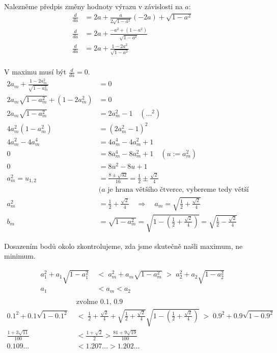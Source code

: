 \documentclass[12pt]{article}
\begin{document}
\begin{enumerate}
\begin{enumerate}
      Nalezněme předpis změny hodnoty výrazu v závislosti na $a$:
      \begin{align*}
        \frac{d}{da} &= 2a + \frac{a}{2\sqrt{1-a^2}}(-2a) + \sqrt{1-a^2} \\
        \frac{d}{da} &= 2a + \frac{-a^2 + (1-a^2)}{\sqrt{1-a^2}} \\
        \frac{d}{da} &= 2a + \frac{1-2a^2}{\sqrt{1-a^2}} \\
      \end{align*}

      V maximu musí být $\frac{d}{da} = 0$.
      \begin{align*}
        2a_m + \frac{1-2a_m^2}{\sqrt{1-a_m^2}} &= 0 \\
        2a_m\sqrt{1-a_m^2} + (1-2a_m^2) &= 0 \\
        2a_m\sqrt{1-a_m^2} &= 2a_m^2-1 \quad (...^2)\\
        4a_m^2(1-a_m^2) &= (2a_m^2-1)^2 \\
        4a_m^2-4a_m^4 &= 4a_m^4 - 4a_m^2 + 1 \\
        0 &= 8a_m^4 - 8a_m^2 + 1 \quad (u:=a_m^2)\\
        0 &= 8u^2 - 8u + 1 \\
        a_m^2 = u_{1,2} &= \frac{8 \pm \sqrt{32}}{16} = \frac{1}{2} \pm \frac{\sqrt{2}}{4} \\
        &\text{($a$ je hrana většího čtverce, vybereme tedy větší hodnotu)} \\
        a_m^2 &= \frac{1}{2} + \frac{\sqrt{2}}{4} \quad \Rightarrow \quad a_m = \sqrt{\frac{1}{2} + \frac{\sqrt{2}}{4}} \\
        b_m &= \sqrt{1 - a_m^2} = \sqrt{1 - (\frac{1}{2} + \frac{\sqrt{2}}{4})} = \sqrt{\frac{1}{2} - \frac{\sqrt{2}}{4}}
      \end{align*}

      Dosazením bodů okolo zkontrolujeme, zda jsme skutečně našli maximum, ne minimum.

      \begin{align*}
        a_1^2 + a_1 \sqrt{1-a_1^2} \; &< \; a_m^2 + a_m \sqrt{1-a_m^2} \; > \; a_2^2 + a_2 \sqrt{1-a_2^2} \\
        a_1 &< a_m < a_2 \\
      \end{align*}
      \begin{align*}
        &\text{zvolme 0.1, 0.9} \\
        0.1^2 + 0.1 \sqrt{1-0.1^2} \; &< \; \frac{1}{2} + \frac{\sqrt{2}}{4} + \sqrt{\frac{1}{2} + \frac{\sqrt{2}}{4}} \sqrt{1-(\frac{1}{2} + \frac{\sqrt{2}}{4})} \; > \; 0.9^2 + 0.9 \sqrt{1-0.9^2} \\
        \frac{1+3\sqrt{11}}{100} &< \frac{1+\sqrt{2}}{2} > \frac{81+9\sqrt{19}}{100} \\
        0.109... &< 1.207... > 1.202...
      \end{align*}


\end{enumerate}
\end{enumerate}
\end{document}
